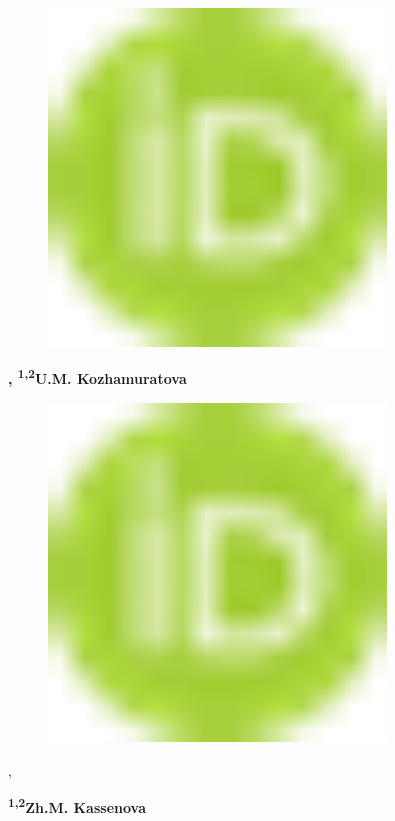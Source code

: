 \begin{figure}[H]
	\centering
	\includegraphics[width=0.8\textwidth]{media/chem2/image1}
	\caption*{}
\end{figure}
{\bfseries ,
\textsuperscript{1,2}U.M.
Kozhamuratova}
\begin{figure}[H]
	\centering
	\includegraphics[width=0.8\textwidth]{media/chem2/image1}
	\caption*{}
\end{figure}
,

{\bfseries \textsuperscript{1,2}Zh.M. Kassenova}

